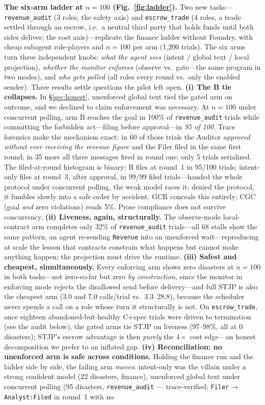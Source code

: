 \documentclass{article}
\newcommand{\stjp}{\textsc{STJP}}
\begin{document}
\textbf{The six-arm ladder at $n{=}100$ (Fig.~\ref{fig:ladder}).}\label{sec:results7} Two new tasks---\texttt{revenue\_audit} (3 roles; the safety axis) and \texttt{escrow\_trade} (4 roles, a trade settled through an escrow, i.e.\ a neutral third party that holds funds until both sides deliver; the cost axis)---replicate the finance ladder without Foundry, with cheap subagent role-players and $n{=}100$ per arm (1{,}200 trials). The six arms turn three independent knobs: \emph{what the agent sees} (intent / global text / local projection), \emph{whether the monitor enforces} (observe vs.\ gate---the same program in two modes), and \emph{who gets polled} (all roles every round vs.\ only the enabled sender). Three results settle questions the pilot left open. \textbf{(i) The B tie collapses.} In \S\ref{sec:honest}, unenforced global text tied the gated arm on outcome, and we declined to claim enforcement was necessary. At $n{=}100$ under concurrent polling, arm B reaches the goal in 100\% of \texttt{revenue\_audit} trials while committing the forbidden act---filing before approval---in \emph{95 of 100}. Trace forensics make the mechanism exact: in 60 of those trials the Auditor \emph{approved without ever receiving the revenue figure} and the Filer filed in the same first round; in 35 more all three messages fired in round one; only 5 trials serialized. The filed-at-round histogram is binary: B files at round~1 in 95/100 trials; intent-only files at round~3, after approval, in 99/99 filed trials---handed the whole protocol under concurrent polling, the weak model races it; denied the protocol, it fumbles slowly into a safe order by accident. GCR conceals this entirely; CGC (goal \emph{and} zero violations) reads 5\%. Prose compliance does not survive concurrency. \textbf{(ii) Liveness, again, structurally.} The observe-mode local-contract arm completes only 32\% of \texttt{revenue\_audit} trials---all 68 stalls show the same pattern, an agent re-sending \texttt{Revenue} into an unenforced wait---reproducing at scale the lesson that contracts constrain what happens but cannot make anything happen; the projection must drive the runtime. \textbf{(iii) Safest and cheapest, simultaneously.} Every enforcing arm shows zero disasters at $n{=}100$ in both tasks---not zero-so-far but zero \emph{by construction}, since the monitor in enforcing mode rejects the disallowed send before delivery---and full \stjp{} is also the cheapest arm (3.0 and 7.0 calls/trial vs.\ 3.3--28.8), because the scheduler never spends a call on a role whose turn it structurally is not. On \texttt{escrow\_trade}, once eighteen abandoned-but-healthy C+spec trials were driven to termination (see the audit below), the gated arms tie \stjp{} on liveness (97--98\%, all at 0 disasters); \stjp{}'s escrow advantage is then \emph{purely} the $4\times$ cost edge---an honest decomposition we prefer to an inflated gap. \textbf{(iv) Reconciliation: no unenforced arm is safe across conditions.} Holding the finance run and the ladder side by side, the failing arm \emph{moves}: intent-only was the villain under a strong confident model (22 disasters, finance), unenforced global text under concurrent polling (95 disasters, \texttt{revenue\_audit} --- trace-verified: \texttt{Filer$\to$Analyst:Filed} in round~1 with no 
\end{document}
